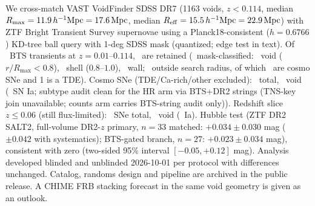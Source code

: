 We cross-match VAST VoidFinder SDSS DR7 (1163 voids, $z<0.114$, median $R_{\max}=11.9\,h^{-1}{\rm Mpc}=17.6\,{\rm Mpc}$, median $R_{\rm eff}=15.5\,h^{-1}{\rm Mpc}=22.9\,{\rm Mpc}$) with ZTF Bright Transient Survey supernovae using a Planck18-consistent ($h=0.6766$) KD-tree ball query with 1-deg SDSS mask (quantized; edge test in text). Of \NBTS\ BTS transients at $z=0.01$--$0.114$, \NRETAINED\ are retained (\NCLASSIFIED\ mask-classified: \NVoidAll\ void ($r/R_{\max}<0.8$), \NShellAll\ shell ($0.8$--$1.0$), \NWallAll\ wall; \NOutsideAll\ outside search radius, of which \NOutCosmo\ are cosmo SNe and 1 is a TDE). Cosmo SNe (TDE/Ca-rich/other excluded): \NCosmo\ total, \NVoidCosmo\ void (\NIaVoid\ SN Ia; subtype audit clean for the HR arm via BTS+DR2 strings (TNS-key join unavailable; counts arm carries BTS-string audit only)). Redshift slice $z\le0.06$ (still flux-limited): \NSlice\ SNe total, \NSliceVoid\ void (\NSliceIaVoid\ Ia). Hubble test (ZTF DR2 SALT2, full-volume DR2-$z$ primary, $n=33$ matched: $+0.034\pm0.030$ mag ($\pm0.042$ with systematics); BTS-gated branch, $n=27$: $+0.023\pm0.034$ mag), consistent with zero (two-sided 95\% interval $[-0.05,+0.12]$ mag). Analysis developed blinded and unblinded 2026-10-01 per protocol with differences unchanged. Catalog, randoms design and pipeline are archived in the public release. A CHIME FRB stacking forecast in the same void geometry is given as an outlook.
